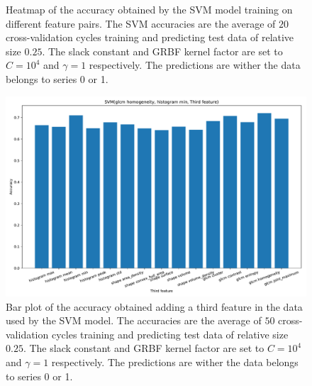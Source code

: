 \begin{figure}[H]
\centering
{}
\caption{Heatmap of the accuracy obtained by the SVM model training on different feature pairs. The SVM accuracies are the average 
of $20$ cross-validation cycles training and predicting test data of relative size $0.25$.
The slack constant and GRBF kernel factor are set to $C=10^4$ and $\gamma=1 $ respectively. 
 The predictions are wither the data belongs to series 0 or 1.}
\label{fig:Figures-feature_pairs4}
\end{figure}

\begin{figure}[H]
\centering
\includegraphics[width=1\textwidth]{Figures/third_feature4}
\caption{Bar plot of the accuracy obtained adding a third feature in the data used 
by the SVM model. The accuracies are the average 
of $50$ cross-validation cycles training and predicting test data of relative size $0.25$.
The slack constant and GRBF kernel factor are set to $C=10^4$ and $\gamma=1 $ respectively.
 The predictions are wither the data belongs to series 0 or 1.}
\label{fig:Figures-third_feature4}
\end{figure}

